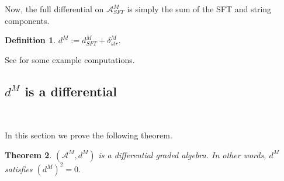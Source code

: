 \documentclass[a4paper,final, reqno]{amsart}
\theoremstyle{plain}
\newtheorem{Th}{Theorem}[section]
\theoremstyle{definition}
\newtheorem{Def}[Th]{Definition}
\newcommand{\A}{\mathcal{A}}
\begin{document}
	Now, the full differential on $\A^M_{SFT}$ is simply the sum of the SFT and string components.
	
	\begin{Def}
		$d^M:= d_{SFT}^M + \delta_{str}^M$. 
	\end{Def}
	
	See  for some example computations. 
	
	\subsection{$d^M$ is a differential}\-\
	
	In this section we prove the following theorem.
	
	\begin{Th} \label{thm:dM2=0}
		$(\A^M, d^M)$ is a differential graded algebra. In other words, $d^M$ satisfies $(d^M)^2 = 0$.
	\end{Th}
	
\end{document}
